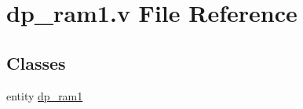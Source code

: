 \hypertarget{dp__ram1_8v}{}\section{dp\+\_\+ram1.\+v File Reference}
\label{dp__ram1_8v}
\subsection*{Classes}
\begin{DoxyCompactItemize}
\item 
entity \mbox{\hyperlink{enumdp__ram1}{dp\+\_\+ram1}}
\end{DoxyCompactItemize}

